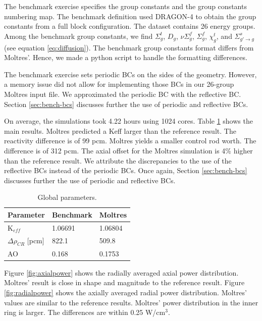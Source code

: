 \documentclass[11pt,letterpaper]{article}
\begin{document}
The benchmark exercise specifies the group constants and the group constants numbering map.
The benchmark definition used DRAGON-4 \cite{marleau_user_2016} to obtain the group constants from a full block configuration.
The dataset contains 26 energy groups.
Among the benchmark group constants, we find $\Sigma_g^t$, $D_g$, $\nu\Sigma_g^f$, $\Sigma_g^f$, $\chi_g^t$, and $\Sigma_{g'\rightarrow g}^s$ (see equation \ref{eq:diffusion}).
The benchmark group constants format differs from Moltres'.
Hence, we made a python script to handle the formatting differences.

The benchmark exercise sets periodic \glspl{BC} on the sides of the geometry.
However, a memory issue did not allow for implementing those BCs in our 26-group Moltres input file.
We approximated the periodic BC with the reflective BC.
Section \ref{sec:bench-bcs} discusses further the use of periodic and reflective BCs.

On average, the simulations took 4.22 hours using 1024 cores.
Table \ref{tab:globalparam} shows the main results.
Moltres predicted a \gls{Keff} larger than the reference result.
The reactivity difference is of 99 pcm.
Moltres yields a smaller control rod worth.
The difference is of 312 pcm.
The axial offset for the Moltres simulation is 4$\%$ higher than the reference result.
We attribute the discrepancies to the use of the reflective BCs instead of the periodic BCs.
Once again, Section \ref{sec:bench-bcs} discusses further the use of periodic and reflective BCs.

\begin{table}[htbp!]
  \centering
  \caption{Global parameters.}
  \begin{tabular}{l|l|l}
  \toprule
  Parameter 	&  Benchmark  &  Moltres    \\
  \midrule
  K$_{eff}$ 	&  1.06691    &  1.06804    \\
  $\Delta \rho_{CR}$ [pcm]  & 822.1 	& 509.8 \\
  AO        	&  0.168      &  0.1753     \\
  \bottomrule
  \end{tabular}
  \label{tab:globalparam}
\end{table}

Figure \ref{fig:axialpower} shows the radially averaged axial power distribution.
Moltres' result is close in shape and magnitude to the reference result.
Figure \ref{fig:radialpower} shows the axially averaged radial power distribution.
Moltres' values are similar to the reference results.
Moltres' power distribution in the inner ring is larger.
The differences are within 0.25 W/cm$^3$.
\end{document}
